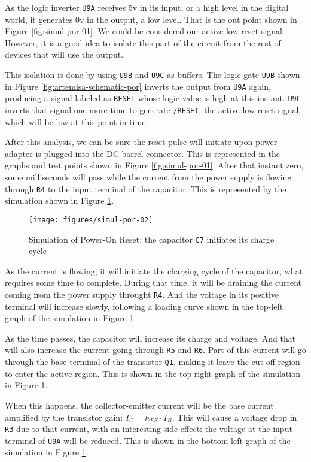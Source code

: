As the logic inverter {\tt U9A} receives 5v in its input, or a high level in the digital world, it generates 0v in the output, a low level. That is the out point shown in Figure \ref{fig:simul-por-01}. We could be considered our active-low reset signal. However, it is a good idea to isolate this part of the circuit from the rest of devices that will use the output.

This isolation is done by using {\tt U9B} and {\tt U9C} as buffers. The logic gate {\tt U9B} shown in Figure \ref{fig:artemisa-schematic-por} inverts the output from {\tt U9A}  again, producing a signal labeled as {\tt RESET} whose logic value is high at this instant. {\tt U9C} inverts that signal one more time to generate {\tt /RESET}, the active-low reset signal, which will be low at this point in time.

After this analysis, we can be sure the reset pulse will initiate upon power adapter is plugged into the DC barrel connector. This is represented in the graphs and test points shown in Figure \ref{fig:simul-por-01}. After that instant zero, some milliseconds will pass while the current from the power supply is flowing through {\tt R4} to the input terminal of the capacitor. This is represented by the simulation shown in Figure \ref{fig:simul-por-02}.

\begin{figure}[htb]
  \centering
  \texttt{[image: figures/simul-por-02]}
  \caption{Simulation of Power-On Reset: the capacitor {\tt C7} initiates its charge cycle}
  \label{fig:simul-por-02}
\end{figure}

As the current is flowing, it will initiate the charging cycle of the capacitor, what requires some time to complete. During that time, it will be draining the current coming from the power supply throught {\tt R4}. And the voltage in its positive terminal will increase slowly, following a loading curve shown in the top-left graph of the simulation in Figure \ref{fig:simul-por-02}.

As the time passes, the capacitor will increase its charge and voltage. And that will also increase the current going through {\tt R5} and {\tt R6}. Part of this current will go through the base terminal of the transistor {\tt Q1}, making it leave the cut-off region to enter the active region. This is shown in the top-right graph of the simulation in Figure \ref{fig:simul-por-02}.

When this happens, the collector-emitter current will be the base current amplified by the transistor gain: $I_C = h_{FE} \cdot I_B$. This will cause a voltage drop in {\tt R3} due to that current, with an interesting side effect: the voltage at the input terminal of {\tt U9A} will be reduced. This is shown in the bottom-left graph of the simulation in Figure \ref{fig:simul-por-02}.


